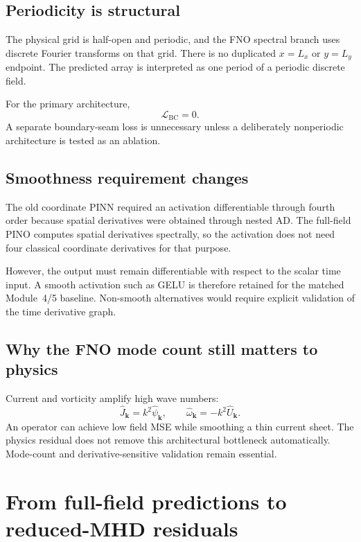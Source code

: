 \documentclass[11pt]{article}
\newcommand{\vect}[1]{\bm{#1}}
\newcommand{\Lbc}{\mathcal{L}_{\mathrm{BC}}}
\begin{document}
\subsection{Periodicity is structural}
The physical grid is half-open and periodic, and the FNO spectral branch uses discrete Fourier transforms on that grid. There is no duplicated $x=L_x$ or $y=L_y$ endpoint. The predicted array is interpreted as one period of a periodic discrete field.

For the primary architecture,
\begin{equation}
\Lbc=0.
\end{equation}
A separate boundary-seam loss is unnecessary unless a deliberately nonperiodic architecture is tested as an ablation.

\subsection{Smoothness requirement changes}
The old coordinate PINN required an activation differentiable through fourth order because spatial derivatives were obtained through nested AD. The full-field PINO computes spatial derivatives spectrally, so the activation does not need four classical coordinate derivatives for that purpose.

However, the output must remain differentiable with respect to the scalar time input. A smooth activation such as GELU is therefore retained for the matched Module~4/5 baseline. Non-smooth alternatives would require explicit validation of the time derivative graph.

\subsection{Why the FNO mode count still matters to physics}
Current and vorticity amplify high wave numbers:
\begin{equation}
\widehat J_{\vect k}=k^2\widehat\psi_{\vect k},
\qquad
\widehat\omega_{\vect k}=-k^2\widehat U_{\vect k}.
\end{equation}
An operator can achieve low field MSE while smoothing a thin current sheet. The physics residual does not remove this architectural bottleneck automatically. Mode-count and derivative-sensitive validation remain essential.

\section{From full-field predictions to reduced-MHD residuals}
\label{sec:residuals}
\end{document}
